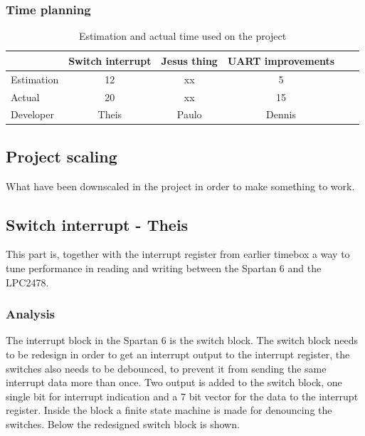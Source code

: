 \subsubsection{Time planning}

\begin{table}[H]
\centering
	\begin{tabular}{|l|c|c|c|c|c|}
		\hline
		~			& Switch interrupt			& Jesus thing		& UART improvements	\\ \hline
		Estimation	& 12					& xx				& 5				\\
		Actual		& 20					& xx				& 15			\\
		Developer	& Theis					& Paulo				& Dennis		\\
		\hline
	\end{tabular}
	\caption{Estimation and actual time used on the project}
\end{table}

\subsection{Project scaling}
What have been downscaled in the project in order to make something to work. 





\subsection{Switch interrupt - Theis}
%
This part is, together with the interrupt register from earlier timebox a way to tune performance in reading and writing between the Spartan 6 and the LPC2478.
\subsubsection{Analysis}
%
%
The interrupt block in the Spartan 6 is the switch block. The switch block needs to be redesign in order to get an interrupt output to the interrupt register, the switches also needs to be debounced, to prevent it from sending the same interrupt data more than once. Two output is added to the switch block, one single bit for interrupt indication and a 7 bit vector for the data to the interrupt register. Inside the block a finite state machine is made for denouncing the switches. Below the redesigned switch block is shown.


